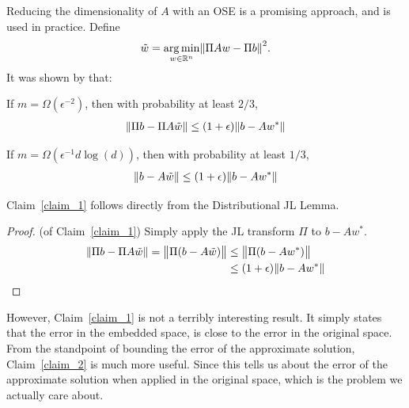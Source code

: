 Reducing the dimensionality of $A$ with an OSE is a promising approach,
and is used in practice. 
Define
\begin{align*}
    \tilde{w} = \argmin_{w \in \rea^n} \norm{\Pi Aw - \Pi b}^2.
\end{align*}
It was shown by \cite{sarlos2006improved} that:
\begin{claim}
\label{claim_1}
    If $m=\Omega(\epsilon^{-2})$, then with probability at least $2/3$, 
    \begin{align}
    \norm{\Pi b - \Pi A\tilde{w}} \leq (1+\epsilon) \norm{b - Aw^*}
    \end{align}
\end{claim}
%
\begin{claim}
    \label{claim_2}
    If $m=\Omega(\epsilon^{-1}d\log(d))$, then with probability at least $1/3$,
    \begin{align}
    \norm{b - A\tilde{w}} \leq (1+\epsilon) \norm{b - Aw^*}
    \end{align}
\end{claim}
%
%
Claim~\ref{claim_1} follows directly from the Distributional JL Lemma.
\begin{proof}(of Claim~\ref{claim_1})
Simply apply the JL transform $\Pi$ to $b - Aw^*$.
\begin{align*}
    \norm{\Pi b - \Pi A\tilde{w}} = \norm{\Pi(b - A\tilde{w})} &\leq \norm{\Pi(b - Aw^*)} \\
        &\leq (1+\epsilon) \norm{b - Aw^*}
\end{align*}
\end{proof}
However, Claim~\ref{claim_1} is not a terribly interesting result. 
It simply states that the error in the embedded space, 
is close to the error in the original space.
From the standpoint of bounding the error of the approximate solution,
Claim~\ref{claim_2} is much more useful.
Since this tells us about the error of the approximate solution
when applied in the original space,
which is the problem we actually care about. 

